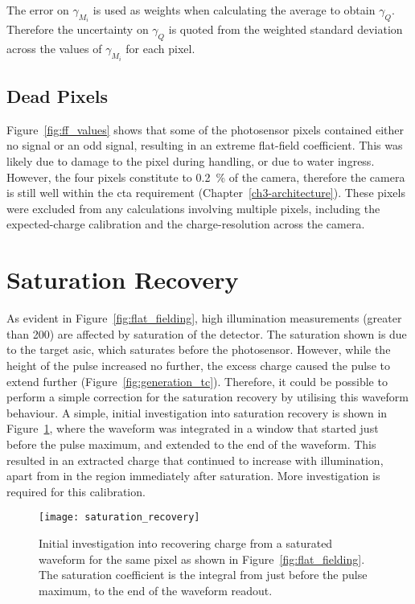 The error on $\gamma_{M_i}$ is used as weights when calculating the average to obtain $\gamma_Q$. Therefore the uncertainty on $\gamma_Q$ is quoted from the weighted standard deviation across the values of $\gamma_{M_i}$ for each pixel.

\subsection{Dead Pixels}

Figure~\ref{fig:ff_values} shows that some of the photosensor pixels contained either no signal or an odd signal, resulting in an extreme flat-field coefficient. This was likely due to damage to the pixel during handling, or due to water ingress. However, the four pixels constitute to \SI{0.2}{\percent} of the camera, therefore the camera is still well within the  \gls{cta} requirement (Chapter~\ref{ch3-architecture}). These pixels were excluded from any calculations involving multiple pixels, including the expected-charge calibration and the charge-resolution across the camera. 

\section{Saturation Recovery}

As evident in Figure~\ref{fig:flat_fielding}, high illumination measurements (greater than \utilde\SI{200}{\pe}) are affected by saturation of the detector. The saturation shown is due to the \gls{target} \gls{asic}, which saturates before the photosensor. However, while the height of the pulse increased no further, the excess charge caused the pulse to extend further (Figure~\ref{fig:generation_tc}). Therefore, it could be possible to perform a simple correction for the saturation recovery by utilising this waveform behaviour. A simple, initial investigation into saturation recovery is shown in Figure~\ref{fig:saturation_recovery}, where the waveform was integrated in a window that started just before the pulse maximum, and extended to the end of the waveform. This resulted in an extracted charge that continued to increase with illumination, apart from in the region immediately after saturation. More investigation is required for this calibration.

\begin{figure}[H]
	\centering
    \texttt{[image: saturation\_recovery]} 
	\caption[Saturation Recovery.]{Initial investigation into recovering charge from a saturated waveform for the same pixel as shown in Figure~\ref{fig:flat_fielding}. The saturation coefficient is the integral from just before the pulse maximum, to the end of the waveform readout.}
	\label{fig:saturation_recovery}
\end{figure}

